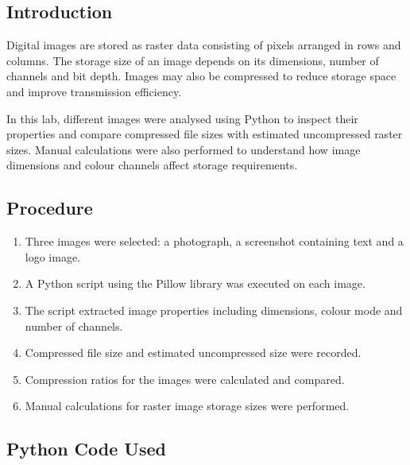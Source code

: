 \documentclass[12pt,a4paper]{article}
\begin{document}
\subsection{Introduction}

Digital images are stored as raster data consisting of pixels arranged in rows and columns. The storage size of an image depends on its dimensions, number of channels and bit depth. Images may also be compressed to reduce storage space and improve transmission efficiency.

In this lab, different images were analysed using Python to inspect their properties and compare compressed file sizes with estimated uncompressed raster sizes. Manual calculations were also performed to understand how image dimensions and colour channels affect storage requirements.

\subsection{Procedure}

\begin{enumerate}
    \item Three images were selected: a photograph, a screenshot containing text and a logo image.
    
    \item A Python script using the Pillow library was executed on each image.
    
    \item The script extracted image properties including dimensions, colour mode and number of channels.
    
    \item Compressed file size and estimated uncompressed size were recorded.
    
    \item Compression ratios for the images were calculated and compared.
    
    \item Manual calculations for raster image storage sizes were performed.
\end{enumerate}

\subsection{Python Code Used}
\end{document}
